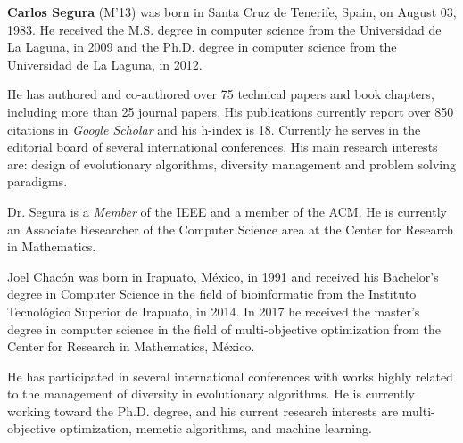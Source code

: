 \documentclass[journal]{IEEEtran}
\begin{document}
\begin{IEEEbiography}{\bf Carlos Segura} (M'13) was born in Santa Cruz de Tenerife, Spain, on August 03, 1983.
He received the M.S. degree in computer science from the Universidad de La Laguna, in 2009 and the Ph.D. degree in computer science from the Universidad de La Laguna, in 2012.

He has authored and co-authored over 75 technical papers and book chapters, including more than 25 journal papers.
His publications currently report over 850 citations in {\em Google Scholar} and his h-index is 18. Currently he serves in the editorial board of several international conferences.
His main research interests are: design of evolutionary algorithms, diversity management and problem solving paradigms.

Dr. Segura is a {\em Member} of the IEEE and a member of the ACM. He is currently an Associate Researcher of the Computer Science area at the Center for Research in Mathematics.

\end{IEEEbiography}

\begin{IEEEbiography}{Joel Chac\'on}
was born in Irapuato, M\'exico, in 1991 and received his Bachelor's degree in Computer Science in the field of
bioinformatic from the Instituto Tecnol\'ogico Superior de Irapuato, in 2014.
In 2017 he received the master's degree in computer science in the field of multi-objective optimization from
the Center for Research in Mathematics, M\'exico.

He has participated in several international conferences with works highly related to the management of diversity
in evolutionary algorithms.
%
He is currently working toward the Ph.D. degree, and his current research interests are multi-objective optimization, 
memetic algorithms, and machine learning.
%
\end{IEEEbiography}
\end{document}

